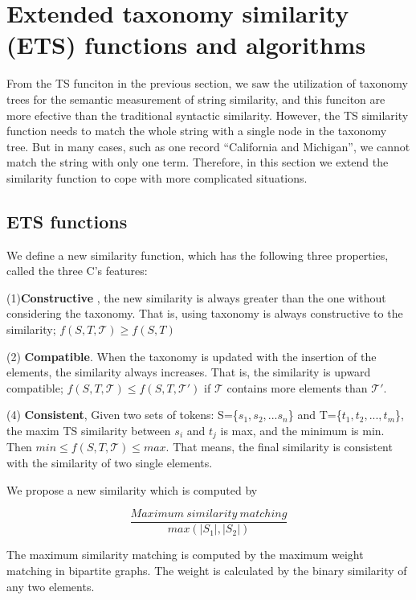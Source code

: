 
\section{Extended taxonomy similarity (ETS) functions and algorithms}

From the TS funciton in the previous section, we saw the utilization of taxonomy trees for the semantic measurement of string similarity, and this funciton are more efective than the traditional syntactic similarity. However, the TS similarity function needs to match the whole string with a single node in the taxonomy tree. But in many cases, such as one record ``California and Michigan'', we cannot match the string with only one term. Therefore, in this section we extend the similarity function to cope with more complicated situations.



\subsection{ETS functions}

We define a new similarity function, which has the following three properties, called the three C's features:

(1)\textbf{Constructive },  the new similarity is always greater than the one without considering the taxonomy. That is, using taxonomy is always constructive to the similarity; $f(S,T,\mathcal{T} ) \geq  f(S,T) $

(2) \textbf{Compatible}. When the taxonomy is updated with the insertion of the elements, the similarity always increases. That is, the similarity is upward compatible; $f(S,T,\mathcal{T} ) \leq  f(S,T, \mathcal{T'}) $ if $\mathcal{T}$ contains more elements than $\mathcal{T'}$.

(4) \textbf{Consistent}, Given two sets of tokens: S=\{$s_1,s_2,...s_n$\} and T=\{$t_1,t_2,...,t_m$\}, the maxim TS similarity between $s_i$ and $t_j$ is max, and the minimum is min. Then $ min \leq f(S,T,\mathcal{T} ) \leq max $. That means, the final similarity is consistent with the similarity of two single elements.


We propose a new  similarity which is computed by

\begin{equation}
\frac{Maximum ~ similarity ~ matching}{max(|S_1|,|S_2|)}
\end{equation}



The maximum  similarity  matching is computed by the maximum weight matching in bipartite graphs. The weight is calculated by the binary similarity of any two elements.

